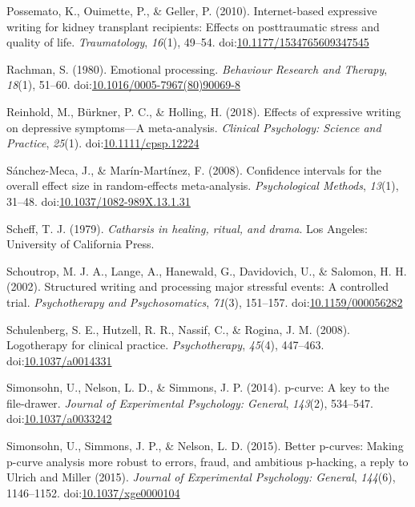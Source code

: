 \documentclass[english,man, mask]{apa6}
\theoremstyle{definition}
\theoremstyle{definition}
\theoremstyle{definition}
\theoremstyle{remark}
\begin{document}
\hypertarget{ref-Possemato2010}{}
Possemato, K., Ouimette, P., \& Geller, P. (2010). Internet-based
expressive writing for kidney transplant recipients: Effects on
posttraumatic stress and quality of life. \emph{Traumatology},
\emph{16}(1), 49--54.
doi:\href{https://doi.org/10.1177/1534765609347545}{10.1177/1534765609347545}

\hypertarget{ref-Rachman1980}{}
Rachman, S. (1980). Emotional processing. \emph{Behaviour Research and
Therapy}, \emph{18}(1), 51--60.
doi:\href{https://doi.org/10.1016/0005-7967(80)90069-8}{10.1016/0005-7967(80)90069-8}

\hypertarget{ref-Reinhold2018}{}
Reinhold, M., Bürkner, P. C., \& Holling, H. (2018). Effects of
expressive writing on depressive symptoms---A meta-analysis.
\emph{Clinical Psychology: Science and Practice}, \emph{25}(1).
doi:\href{https://doi.org/10.1111/cpsp.12224}{10.1111/cpsp.12224}

\hypertarget{ref-Sanchez-Meca2008a}{}
Sánchez-Meca, J., \& Marín-Martínez, F. (2008). Confidence intervals for
the overall effect size in random-effects meta-analysis.
\emph{Psychological Methods}, \emph{13}(1), 31--48.
doi:\href{https://doi.org/10.1037/1082-989X.13.1.31}{10.1037/1082-989X.13.1.31}

\hypertarget{ref-Scheff1979}{}
Scheff, T. J. (1979). \emph{Catharsis in healing, ritual, and drama}.
Los Angeles: University of California Press.

\hypertarget{ref-Schoutrop2002}{}
Schoutrop, M. J. A., Lange, A., Hanewald, G., Davidovich, U., \&
Salomon, H. H. (2002). Structured writing and processing major stressful
events: A controlled trial. \emph{Psychotherapy and Psychosomatics},
\emph{71}(3), 151--157.
doi:\href{https://doi.org/10.1159/000056282}{10.1159/000056282}

\hypertarget{ref-Schulenberg2008}{}
Schulenberg, S. E., Hutzell, R. R., Nassif, C., \& Rogina, J. M. (2008).
Logotherapy for clinical practice. \emph{Psychotherapy}, \emph{45}(4),
447--463. doi:\href{https://doi.org/10.1037/a0014331}{10.1037/a0014331}

\hypertarget{ref-Simonsohn2014}{}
Simonsohn, U., Nelson, L. D., \& Simmons, J. P. (2014). p-curve: A key
to the file-drawer. \emph{Journal of Experimental Psychology: General},
\emph{143}(2), 534--547.
doi:\href{https://doi.org/10.1037/a0033242}{10.1037/a0033242}

\hypertarget{ref-Simonsohn2015}{}
Simonsohn, U., Simmons, J. P., \& Nelson, L. D. (2015). Better p-curves:
Making p-curve analysis more robust to errors, fraud, and ambitious
p-hacking, a reply to Ulrich and Miller (2015). \emph{Journal of
Experimental Psychology: General}, \emph{144}(6), 1146--1152.
doi:\href{https://doi.org/10.1037/xge0000104}{10.1037/xge0000104}
\end{document}

